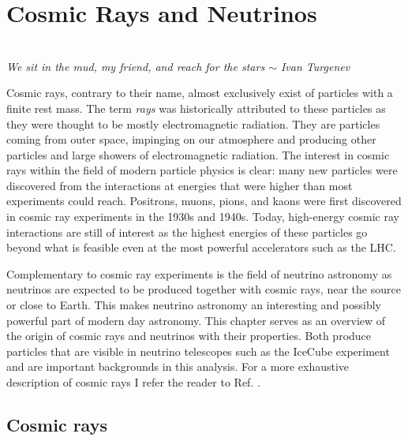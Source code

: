\chapter{Cosmic Rays and Neutrinos}
\label{ch:cr}
\begin{flushright}
\textit{\\We sit in the mud, my friend, and reach for the stars $\sim$ Ivan Turgenev\\}\end{flushright}


\noindent Cosmic rays, contrary to their name, almost exclusively exist of particles with a finite rest mass. The term \textit{rays} was historically attributed to these particles as they were thought to be mostly electromagnetic radiation. They are particles coming from outer space, impinging on our atmosphere and producing other particles and large showers of electromagnetic radiation.
The interest in cosmic rays within the field of modern particle physics is clear: many new particles were discovered from the interactions at energies that were higher than most experiments could reach. Positrons, muons, pions, and kaons were first discovered in cosmic ray experiments in the 1930s and 1940s. Today, high-energy cosmic ray interactions are still of interest as the highest energies of these particles go beyond what is feasible even at the most powerful accelerators such as the LHC.

Complementary to cosmic ray experiments is the field of neutrino astronomy as neutrinos are expected to be produced together with cosmic rays, near the source or close to Earth. This makes neutrino astronomy an interesting and possibly powerful part of modern day astronomy. This chapter serves as an overview of the origin of cosmic rays and neutrinos with their properties. Both produce particles that are visible in neutrino telescopes such as the IceCube experiment and are important backgrounds in this analysis. For a more exhaustive description of cosmic rays I refer the reader to Ref. \cite{Gaisser:2016uoy}.

\section{Cosmic rays}
